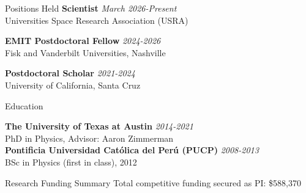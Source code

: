 \documentclass{resume}
\begin{document}



\begin{rSection}{Positions Held}\vspace{0.4cm}
{\bf Scientist} \hfill {\em March 2026-Present}
\\ Universities Space Research Association (USRA)

{\bf EMIT Postdoctoral Fellow} \hfill {\em 2024-2026}
\\ Fisk and Vanderbilt Universities, Nashville

{\bf Postdoctoral Scholar} \hfill {\em 2021-2024}
\\ University of California, Santa Cruz
\end{rSection}
\begin{rSection}{Education}\vspace{0.4cm}


{\bf The University of Texas at Austin} \hfill {\em 2014-2021} 
\\ PhD in Physics, Advisor: Aaron Zimmerman
\\

{\bf Pontificia Universidad Cat\'{o}lica del Per\'{u} (PUCP)} \hfill {\em 2008-2013} 
\\ BSc in Physics (first in class), 2012
\end{rSection}

\begin{rSection}{Research Funding Summary}\vspace{0.4cm}
Total competitive funding secured as PI: \$588,370
\end{rSection}
\end{document}
